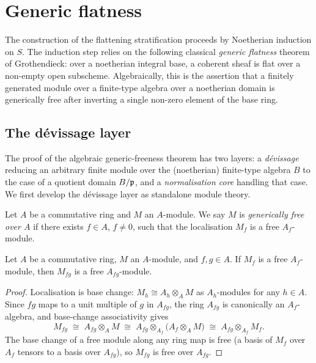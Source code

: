 \section{Generic flatness}
\label{mk-sec:generic_flatness}

The construction of the flattening stratification proceeds by Noetherian
induction on \(S\). The induction step relies on the following classical
\emph{generic flatness} theorem of Grothendieck: over a noetherian integral
base, a coherent sheaf is flat over a non-empty open subscheme. Algebraically,
this is the assertion that a finitely generated module over a finite-type
algebra over a noetherian domain is generically free after inverting a single
non-zero element of the base ring.

\subsection{The dévissage layer}
\label{mk-sec:generic_freeness_devissage}

The proof of the algebraic generic-freeness theorem has two layers: a
\emph{dévissage} reducing an arbitrary finite module over the (noetherian)
finite-type algebra \(B\) to the case of a quotient domain \(B/\mathfrak{p}\), and a
\emph{normalisation core} handling that case. We first develop the dévissage
layer as standalone module theory.

\begin{definition}\label{mk-def:generically_free}
  \leanok

  Let \(A\) be a commutative ring and \(M\) an \(A\)-module.  We say \(M\) is
  \emph{generically free over \(A\)} if there exists \(f \in A\), \(f \ne 0\),
  such that the localisation \(M_f\) is a free \(A_f\)-module.
\end{definition}

\begin{lemma}\label{mk-lem:generically_free_transport}
  \leanok

  Let \(A\) be a commutative ring, \(M\) an \(A\)-module, and \(f, g \in A\).
  If \(M_f\) is a free \(A_f\)-module, then \(M_{fg}\) is a free
  \(A_{fg}\)-module.
\end{lemma}

\begin{proof}
  \leanok
Localisation is base change: \(M_h \cong A_h \otimes_A M\) as
  \(A_h\)-modules for any \(h \in A\).  Since \(fg\) maps to a unit multiple
  of \(g\) in \(A_{fg}\), the ring \(A_{fg}\) is canonically an
  \(A_f\)-algebra, and base-change associativity gives
  \[
    M_{fg} \;\cong\; A_{fg} \otimes_A M
    \;\cong\; A_{fg} \otimes_{A_f} \bigl(A_f \otimes_A M\bigr)
    \;\cong\; A_{fg} \otimes_{A_f} M_f .
  \]
  The base change of a free module along any ring map is free (a basis of
  \(M_f\) over \(A_f\) tensors to a basis over \(A_{fg}\)), so \(M_{fg}\) is
  free over \(A_{fg}\).
\end{proof}

